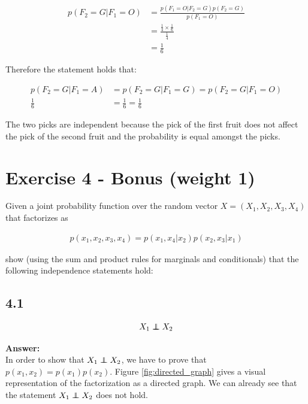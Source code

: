 \documentclass[a4paper]{article}
\newcommand\independent{\protect\mathpalette{\protect\independenT}{\perp}}
\def\independenT#1#2{\mathrel{\rlap{$#1#2$}\mkern2mu{#1#2}}}
\begin{document}
\begin{align*}
	p(F_2 = G | F_1 = O) &= \frac{p(F_1 = O | F_2 = G)p(F_2 = G)}{p(F_1 = O)}\\
	&= \frac{\frac{1}{4} \times \frac{1}{6}}{\frac{1}{4}}\\
	&= \frac{1}{6}
\end{align*}

Therefore the statement holds that:

\begin{align*}
p(F_2 = G | F_1 = A) &= p(F_2 = G | F_1 = G) = p(F_2 = G | F_1 = O)\\
\frac{1}{6} &= \frac{1}{6} = \frac{1}{6}
\end{align*}

The two picks are independent because the pick of the first fruit does not affect the pick of the second fruit and the probability is equal amongst the picks.

\section*{Exercise 4 - Bonus (weight 1)}

Given a joint probability function over the random vector $X = (X_1, X_2, X_3, X_4)$ that factorizes as

\begin{align*}
	p(x_1,x_2,x_3,x_4) = p(x_1,x_4|x_2)p(x_2,x_3|x_1)
\end{align*}

show (using the sum and product rules for marginals and conditionals) that the following independence statements hold:

\subsection*{4.1}

\begin{align*}
	X_1 \independent X_2
\end{align*}


\textbf{Answer:}\\

In order to show that $X_1 \independent X_2$, we have to prove that $p(x_1, x_2) = p(x_1)p(x_2)$. Figure \ref{fig:directed_graph} gives a visual representation of the factorization as a directed graph. We can already see that the statement $X_1 \independent X_2$ does not hold.
\end{document}
